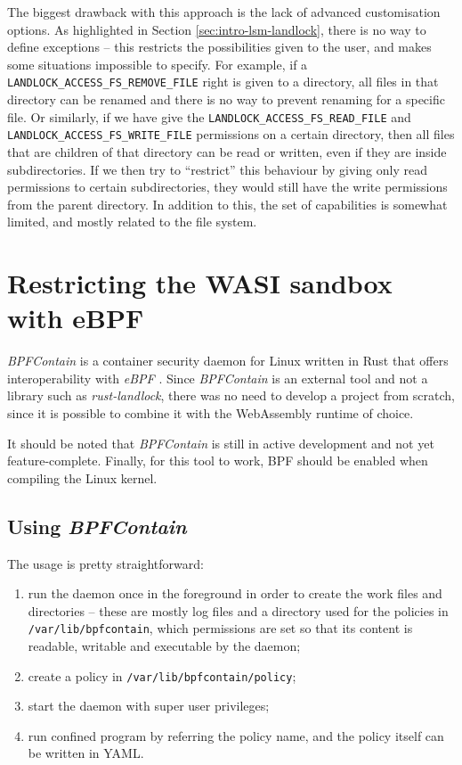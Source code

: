 The biggest drawback with this approach is the lack of advanced customisation options.
As highlighted in Section \ref{sec:intro-lsm-landlock},
there is no way to define exceptions -- this restricts the possibilities given to the user, and makes some situations
impossible to specify. For example, if a \texttt{LANDLOCK\_ACCESS\_FS\_REMOVE\_FILE} right is given to a directory,
all files in that directory can be renamed and there is no way to prevent renaming for a specific file.
Or similarly, if we have give the \texttt{LANDLOCK\_ACCESS\_FS\_READ\_FILE} and \texttt{LANDLOCK\_ACCESS\_FS\_WRITE\_FILE}
permissions on a certain directory, then all files that are children of that directory can be read or written, even
if they are inside subdirectories. If we then try to ``restrict'' this behaviour by giving only read permissions to
certain subdirectories, they would still have the write permissions from the parent directory.
In addition to this, the set of capabilities is somewhat limited, and mostly related to the file system.

\clearpage
\section{Restricting the WASI sandbox with eBPF}
\label{sec:restricting-wasi-ebpf}

\textit{BPFContain} \cite{bpfcontain} is a container security daemon for Linux written in Rust that offers
interoperability with \textit{eBPF} \cite{ebpf}.
Since \textit{BPFContain} is an external tool and not a library such as \textit{rust-landlock}, there was no need
to develop a project from scratch, since it is possible to combine it with the WebAssembly runtime of choice.

It should be noted that \textit{BPFContain} is still in active development and not yet feature-complete.
Finally, for this tool to work, BPF should be enabled when compiling the Linux kernel.

\subsection{Using \textit{BPFContain}}

The usage is pretty straightforward:
\begin{enumerate}
  \item run the daemon once in the foreground in order to create the work files and directories --
        these are mostly log files and a directory used for the policies in \texttt{/var/lib/bpfcontain},
        which permissions are set so that its content is readable, writable and executable by the daemon;
  \item create a policy in \texttt{/var/lib/bpfcontain/policy};
  \item start the daemon with super user privileges;
  \item run confined program by referring the policy name, and the policy itself can be written in YAML.
\end{enumerate}

